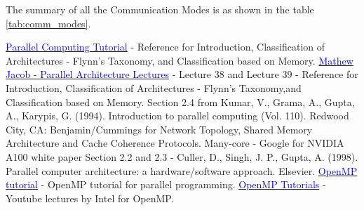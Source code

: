 \documentclass[12pt]{article}
\newcommand{\weblink}[2]{\href{#1}{\textcolor{blue}{#2}}}
\begin{document}
The summary of all the Communication Modes is as shown in the table \ref{tab:comm_modes}.





    









\newpage

\begin{thebibliography}{9}
    \weblink{http://www.llnl.gov/computing/tutorials/parallel_comp/}{Parallel Computing Tutorial} - Reference for Introduction, Classification of Architectures - Flynn's Taxonomy, and Classification based on Memory.
    \weblink{https://youtu.be/-yMWgtTeQgY?si=_PIhzFH7zZTydzcM}{Mathew Jacob - Parallel Architecture Lectures} - Lecture 38 and Lecture 39 - Reference for Introduction, Classification of Architectures - Flynn's Taxonomy,and Classification based on Memory.
    Section 2.4 from Kumar, V., Grama, A., Gupta, A., Karypis, G. (1994). Introduction to parallel computing (Vol. 110). Redwood City, CA: Benjamin/Cummings for Network Topology, Shared Memory Architecture and Cache Coherence Protocols.
    Many-core - Google for NVIDIA A100 white paper
    Section 2.2 and 2.3 - Culler, D., Singh, J. P., Gupta, A. (1998). Parallel computer architecture: a hardware/software approach. Elsevier.
    \weblink{https://hpc-tutorials.llnl.gov/openmp/}{OpenMP tutorial} - OpenMP tutorial for parallel programming.
    \weblink{https://www.youtube.com/watch?v=nE-xN4Bf8XI&list=PLLX-Q6B8xqZ8n8bwjGdzBJ25X2utwnoEG}{OpenMP Tutorials} - Youtube lectures by Intel for OpenMP.

\end{thebibliography}
\end{document}
